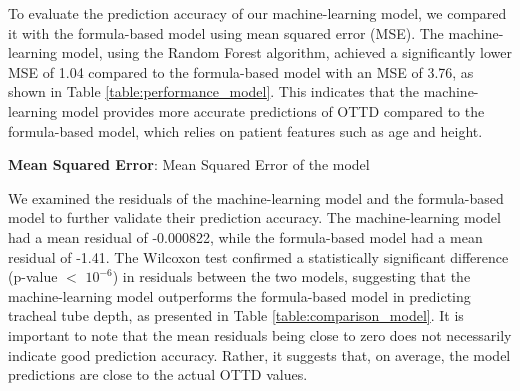 \documentclass[11pt]{article}
\begin{document}
To evaluate the prediction accuracy of our machine-learning model, we compared it with the formula-based model using mean squared error (MSE). The machine-learning model, using the Random Forest algorithm, achieved a significantly lower MSE of 1.04 compared to the formula-based model with an MSE of 3.76, as shown in Table {}\ref{table:performance_model}. This indicates that the machine-learning model provides more accurate predictions of OTTD compared to the formula-based model, which relies on patient features such as age and height.

\begin{table}[h]
\caption{Performance comparison between Machine-Learning model and Formula-Based model}
\label{table:performance_model}
\begin{threeparttable}
\renewcommand{\TPTminimum}{\linewidth}
\begin{tablenotes}
\footnotesize
\item \textbf{Mean Squared Error}: Mean Squared Error of the model
\end{tablenotes}
\end{threeparttable}
\end{table}


We examined the residuals of the machine-learning model and the formula-based model to further validate their prediction accuracy. The machine-learning model had a mean residual of -0.000822, while the formula-based model had a mean residual of -1.41. The Wilcoxon test confirmed a statistically significant difference (p-value $<$ $10^{-6}$) in residuals between the two models, suggesting that the machine-learning model outperforms the formula-based model in predicting tracheal tube depth, as presented in Table {}\ref{table:comparison_model}. It is important to note that the mean residuals being close to zero does not necessarily indicate good prediction accuracy. Rather, it suggests that, on average, the model predictions are close to the actual OTTD values.
\end{document}
